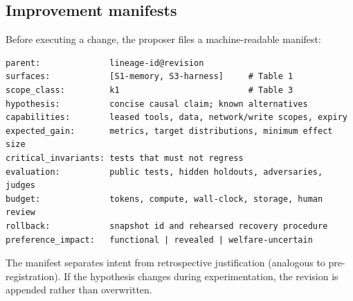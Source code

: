 \documentclass[11pt,a4paper]{article}
\begin{document}
\subsection{Improvement manifests}\label{sec:manifest}
Before executing a change, the proposer files a machine-readable manifest:\par\smallskip
\noindent\begin{minipage}{\linewidth}\begin{lstlisting}
parent:              lineage-id@revision
surfaces:            [S1-memory, S3-harness]     # Table 1
scope_class:         k1                          # Table 3
hypothesis:          concise causal claim; known alternatives
capabilities:        leased tools, data, network/write scopes, expiry
expected_gain:       metrics, target distributions, minimum effect size
critical_invariants: tests that must not regress
evaluation:          public tests, hidden holdouts, adversaries, judges
budget:              tokens, compute, wall-clock, storage, human review
rollback:            snapshot id and rehearsed recovery procedure
preference_impact:   functional | revealed | welfare-uncertain
\end{lstlisting}\end{minipage}\par\smallskip
\noindent The manifest separates intent from retrospective justification (analogous to pre-registration). If the hypothesis changes during experimentation, the revision is appended rather than overwritten.
\end{document}
